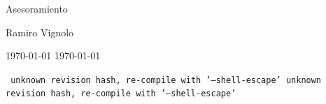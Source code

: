 \documentclass{article}
\begin{document}
\begin{secciondoscol}{Asesoramiento}
\end{secciondoscol}



\vspace{\fill}
\hspace{0.6\linewidth}
\begin{minipage}{0.35\linewidth}
 \begin{center}
 Ramiro Vignolo\\
\immediate{}
\immediate{}

\makeatletter
\ifcase\pdf@shellescape
  \today\or
  \or
  \today\fi

\scriptsize{\texttt{
\ifcase\pdf@shellescape
  unknown revision hash, re-compile with '--shell-escape'\or
  \or
  unknown revision hash, re-compile with '--shell-escape'\fi
}}
\makeatother
 
 \end{center}
\end{minipage}
\end{document}
